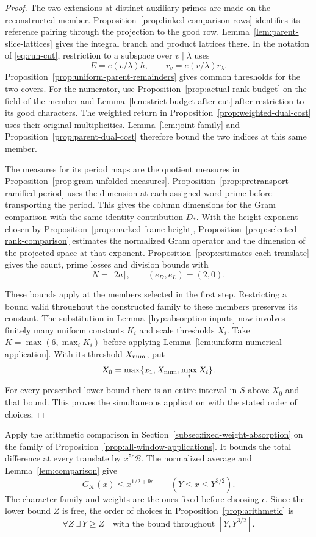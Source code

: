 \begin{proof}
The two extensions at distinct auxiliary primes are made on the
reconstructed member. Proposition~\ref{prop:linked-comparison-rows}
identifies its reference pairing through the projection to the good
row. Lemma~\ref{lem:parent-slice-lattices} gives the integral
branch and product lattices there. In the notation of
\eqref{eq:run-cut}, restriction to a subspace over \(v\mid\lambda\)
uses
\[
     E=e(v/\lambda)h,\qquad r_v=e(v/\lambda)r_\lambda.
\]
Proposition~\ref{prop:uniform-parent-remainders} gives common
thresholds for the two covers. For the numerator, use
Proposition~\ref{prop:actual-rank-budget} on the field of the
member and Lemma~\ref{lem:strict-budget-after-cut} after restriction
to its good characters. The weighted return in
Proposition~\ref{prop:weighted-dual-cost} uses their original
multiplicities. Lemma~\ref{lem:joint-family} and
Proposition~\ref{prop:parent-dual-cost} therefore bound the two
indices at this same member.

The measures for its period maps are the quotient measures in
Proposition~\ref{prop:gram-unfolded-measures}. Proposition~\ref{prop:pretransport-ramified-period}
uses the dimension at each assigned word prime before transporting
the period. This gives the column dimensions for the Gram comparison
with the same identity contribution \(D_*\). With the height
exponent chosen by Proposition~\ref{prop:marked-frame-height},
Proposition~\ref{prop:selected-rank-comparison} estimates the
normalized Gram operator and the dimension of the projected space
at that exponent. Proposition~\ref{prop:estimates-each-translate}
gives the count, prime losses and division bounds with
\[
      N=\lceil2a\rceil,\qquad (e_D,e_L)=(2,0).
\]

These bounds apply at the members selected in the first step.
Restricting a bound valid throughout the constructed family to
these members preserves its constant. The substitution in
Lemma~\ref{hyp:absorption-inputs} now involves finitely many
uniform constants \(K_i\) and scale thresholds \(X_i\).
Take \(K=\max(6,\max_i K_i)\) before applying
Lemma~\ref{lem:uniform-numerical-application}. With its threshold
\(X_{\rm num}\), put
\[
             X_0=\max\{x_1,X_{\rm num},\max_i X_i\}.
\]
For every prescribed lower bound there is an entire interval in
\(S\) above \(X_0\) and that bound. This proves the simultaneous
application with the stated order of choices.
\end{proof}

Apply the arithmetic comparison in Section~\ref{subsec:fixed-weight-absorption}
on the family of Proposition~\ref{prop:all-window-applications}.
It bounds the total
difference at every translate by \(x^{5\epsilon}\mathcal B\).
The normalized average and Lemma~\ref{lem:comparison} give
\[
       G_{\mathcal K}(x)\le x^{1/2+9\epsilon}
          \qquad(Y\le x\le Y^{3/2}).
\]
The character family and weights are the ones fixed before
choosing \(\epsilon\). Since the lower bound \(Z\) is free, the order of choices in Proposition~\ref{prop:arithmetic} is
\[
 \forall Z\ \exists\,Y\ge Z\quad\text{with the bound throughout }[Y,Y^{3/2}].
\]
\label{cor:window-points-5}

